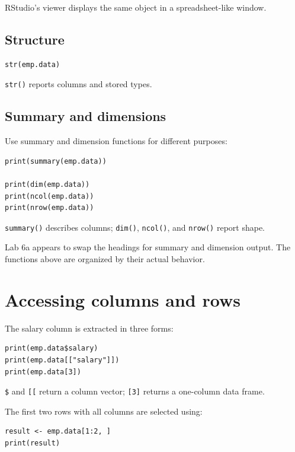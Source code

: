 RStudio's viewer displays the same object in a spreadsheet-like window.

\subsection{Structure}

\begin{lstlisting}[style=dsr]
str(emp.data)
\end{lstlisting}

\texttt{str()} reports columns and stored types.

\subsection{Summary and dimensions}

Use summary and dimension functions for different purposes:

\begin{lstlisting}[style=dsr]
print(summary(emp.data))

print(dim(emp.data))
print(ncol(emp.data))
print(nrow(emp.data))
\end{lstlisting}

\texttt{summary()} describes columns; \texttt{dim()}, \texttt{ncol()}, and \texttt{nrow()} report shape.

\begin{pitfall}
Lab 6a appears to swap the headings for summary and dimension output. The functions above are organized by their actual behavior.
\end{pitfall}

\section{Accessing columns and rows}

The salary column is extracted in three forms:

\begin{lstlisting}[style=dsr]
print(emp.data$salary)
print(emp.data[["salary"]])
print(emp.data[3])
\end{lstlisting}

\texttt{\$} and \texttt{[[} return a column vector; \texttt{[3]} returns a one-column data frame.

The first two rows with all columns are selected using:

\begin{lstlisting}[style=dsr]
result <- emp.data[1:2, ]
print(result)
\end{lstlisting}

